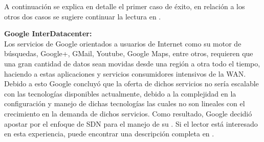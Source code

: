 A continuaci\'on se explica en detalle el primer caso de éxito, en relaci\'on a los otros dos casos se sugiere continuar la lectura en \cite{ONFSuccessCase}.

\textbf{Google InterDatacenter:}\\

Los servicios de Google orientados a usuarios de Internet como su motor de búsquedas, Google+, GMail, Youtube, Google Maps, entre otros, requieren que una gran cantidad de datos sean movidas desde una región a otra todo el tiempo, haciendo a estas aplicaciones y servicios consumidores intensivos de la WAN. Debido a esto Google concluy\'o que la oferta de dichos servicios no sería escalable con las tecnologías disponibles actualmente, debido a la complejidad en la configuración y manejo de dichas tecnologías las cuales no son lineales con el crecimiento en la demanda de dichos servicios. Como resultado, Google decidió apostar por el enfoque de SDN para el manejo de su . Si el lector est\'a interesado en esta experiencia, puede encontrar una descripción completa en \cite{jain2013b4}.


 


